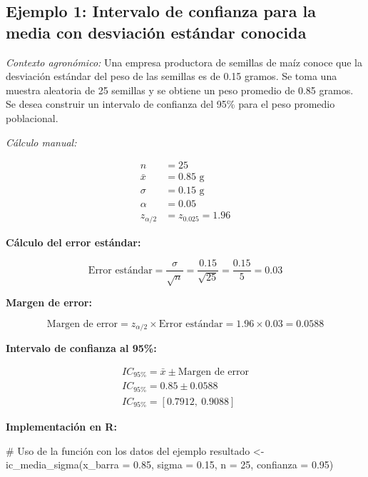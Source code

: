 \documentclass[
  spanish,
  letterpaper,
]{book}
\newenvironment{Shaded}{\begin{snugshade}}{\end{snugshade}}
\newcommand{\AttributeTok}[1]{\textcolor[rgb]{0.40,0.45,0.13}{#1}}
\newcommand{\CommentTok}[1]{\textcolor[rgb]{0.37,0.37,0.37}{#1}}
\newcommand{\DecValTok}[1]{\textcolor[rgb]{0.68,0.00,0.00}{#1}}
\newcommand{\FloatTok}[1]{\textcolor[rgb]{0.68,0.00,0.00}{#1}}
\newcommand{\FunctionTok}[1]{\textcolor[rgb]{0.28,0.35,0.67}{#1}}
\newcommand{\NormalTok}[1]{\textcolor[rgb]{0.00,0.23,0.31}{#1}}
\newcommand{\OtherTok}[1]{\textcolor[rgb]{0.00,0.23,0.31}{#1}}
\begin{document}
\subsection{Ejemplo 1: Intervalo de confianza para la media con
desviación estándar
conocida}\label{ejemplo-1-intervalo-de-confianza-para-la-media-con-desviaciuxf3n-estuxe1ndar-conocida}

\emph{Contexto agronómico:} Una empresa productora de semillas de maíz
conoce que la desviación estándar del peso de las semillas es de 0.15
gramos. Se toma una muestra aleatoria de 25 semillas y se obtiene un
peso promedio de 0.85 gramos. Se desea construir un intervalo de
confianza del 95\% para el peso promedio poblacional.

\emph{Cálculo manual:}

\[
\begin{aligned}
n &= 25 \\
\bar{x} &= 0.85 \text{ g} \\
\sigma &= 0.15 \text{ g} \\
\alpha &= 0.05 \\
z_{\alpha/2} &= z_{0.025} = 1.96
\end{aligned}
\]

\textbf{Cálculo del error estándar:}

\[
\text{Error estándar} = \frac{\sigma}{\sqrt{n}} = \frac{0.15}{\sqrt{25}} = \frac{0.15}{5} = 0.03
\]

\textbf{Margen de error:}

\[
\text{Margen de error} = z_{\alpha/2} \times \text{Error estándar} = 1.96 \times 0.03 = 0.0588
\]

\textbf{Intervalo de confianza al 95\%:}

\[
\begin{aligned}
IC_{95\%} = \bar{x} \pm \text{Margen de error}  \\ 
IC_{95\%} = 0.85 \pm 0.0588  \\
IC_{95\%} = [0.7912,\ 0.9088]
 \end{aligned}
\]

\textbf{Implementación en R:}

\begin{Shaded}
\begin{Highlighting}[]
\CommentTok{\# Uso de la función con los datos del ejemplo}
\NormalTok{resultado }\OtherTok{\textless{}{-}} \FunctionTok{ic\_media\_sigma}\NormalTok{(}\AttributeTok{x\_barra =} \FloatTok{0.85}\NormalTok{,}
                            \AttributeTok{sigma =} \FloatTok{0.15}\NormalTok{, }
                            \AttributeTok{n =} \DecValTok{25}\NormalTok{, }
                            \AttributeTok{confianza =} \FloatTok{0.95}\NormalTok{)}
\end{Highlighting}
\end{Shaded}
\end{document}
